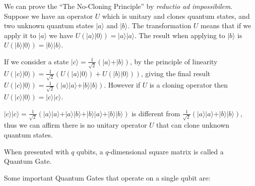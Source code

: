 We can prove the ``The No-Cloning Principle'' by \textit{reductio ad impossibilem}. Suppose we have an operator $U$ which is unitary and clones quantum states, and two unknown quantum states $\vert a \rangle$ and $\vert  b \rangle$. The transformation $U$ means that if we apply it to $\vert a \rangle$ we have $U(\vert a \rangle\vert 0 \rangle)=\vert a \rangle\vert a \rangle$. The result when applying to $\vert b \rangle$ is  $U(\vert b \rangle\vert 0 \rangle)=\vert b \rangle\vert b \rangle$. 

If we consider a state  $\vert c \rangle = \frac{1}{\sqrt{2}}( \vert a \rangle + \vert b \rangle)$, by the principle of linearity $U(\vert c \rangle\vert 0 \rangle)=\frac{1}{\sqrt{2}}( U(\vert a \rangle\vert 0 \rangle) +U(\vert b \rangle\vert 0 \rangle))$, giving the final result $U(\vert c \rangle\vert 0 \rangle)=\frac{1}{\sqrt{2}}( \vert a \rangle\vert a \rangle + \vert b \rangle\vert b \rangle)$. However if $U$ is a cloning operator then $U(\vert c \rangle\vert 0 \rangle)=\vert c \rangle\vert c \rangle$. 

$\vert c \rangle\vert c \rangle = \frac{1}{\sqrt{2}}( \vert a \rangle\vert a \rangle + \vert a \rangle\vert b \rangle+ \vert b \rangle\vert a \rangle+ \vert b \rangle\vert b \rangle)$ is different from $\frac{1}{\sqrt{2}}( \vert a \rangle\vert a \rangle + \vert b \rangle\vert b \rangle)$, thus we can affirm there is no unitary operator $U$ that can clone unknown quantum states\cite{Rieffel2011}.

When presented with $q$ qubits, a $q$-dimensional square matrix is called a Quantum Gate.



Some important Quantum Gates that operate on a single qubit are:

